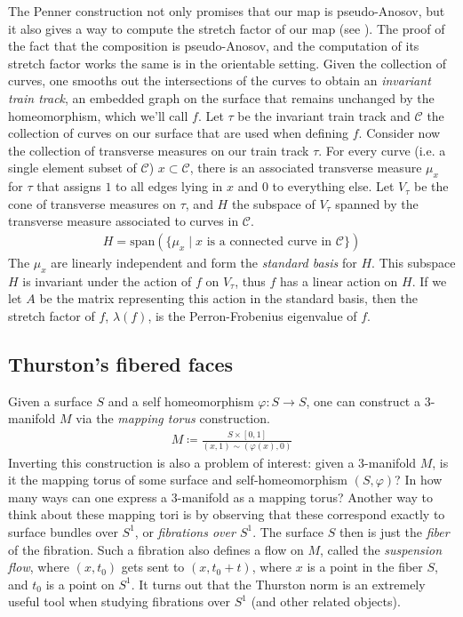 The Penner construction not only promises that our map is pseudo-Anosov, but it also gives a way to
compute the stretch factor of our map (see \cite{penner1988construction}).  The proof of the fact
that the composition is pseudo-Anosov, and the computation of its stretch factor works the same is
in the orientable setting.  Given the collection of curves, one smooths out the intersections of the
curves to obtain an \textit{invariant train track}, an embedded graph on the surface that remains
unchanged by the homeomorphism, which we'll call $f$. Let $\tau$ be the invariant train track and
$\mathcal{C}$ the collection of curves on our surface that are used when defining $f$. Consider now
the collection of transverse measures on our train track $\tau$. For every curve (i.e. a single
element subset of $\mathcal{C}$) $x \subset \mathcal{C}$, there is an associated transverse measure
$\mu_x$ for $\tau$ that assigns $1$ to all edges lying in $x$ and 0 to everything else. Let $V_\tau$
be the cone of transverse measures on $\tau$, and $H$ the subspace of $V_\tau$ spanned by the
transverse measure associated to curves in $\mathcal{C}$.
\begin{align*}
  H = \mathrm{span}(\{\mu_x \mid x \text{ is a connected curve in } \mathcal{C}\})
\end{align*}
The $\mu_x$ are linearly independent and form the \textit{standard basis} for $H$. This subspace $H$
is invariant under the action of $f$ on $V_\tau$, thus $f$ has a linear action on $H$. If we let $A$
be the matrix representing this action in the standard basis, then the stretch factor of $f$,
$\lambda(f)$, is the Perron-Frobenius eigenvalue of $f$.

\subsection{Thurston's fibered faces}
\label{sec:thurst-fiber-face}

Given a surface $S$ and a self homeomorphism $\varphi: S \to S$, one can construct a $3$-manifold $M$ via
the \emph{mapping torus} construction.
\begin{align*}
  M \coloneqq \frac{S \times [0,1]}{(x,1) \sim (\varphi(x), 0)}
\end{align*}
Inverting this construction is also a problem of interest: given a $3$-manifold $M$, is it the
mapping torus of some surface and self-homeomorphism $(S,\varphi)$? In how many ways can one express a
$3$-manifold as a mapping torus? Another way to think about these mapping tori is by observing that
these correspond exactly to surface bundles over $S^1$, or \emph{fibrations over $S^1$}. The surface
$S$ then is just the \emph{fiber} of the fibration. Such a fibration also defines a {flow} on $M$,
called the \emph{suspension flow}, where $(x, t_0)$ gets sent to $(x, t_0 + t)$, where $x$ is a point
in the fiber $S$, and $t_0$ is a point on $S^1$. It turns out that the Thurston norm is an extremely
useful tool when studying fibrations over $S^1$ (and other related objects).

